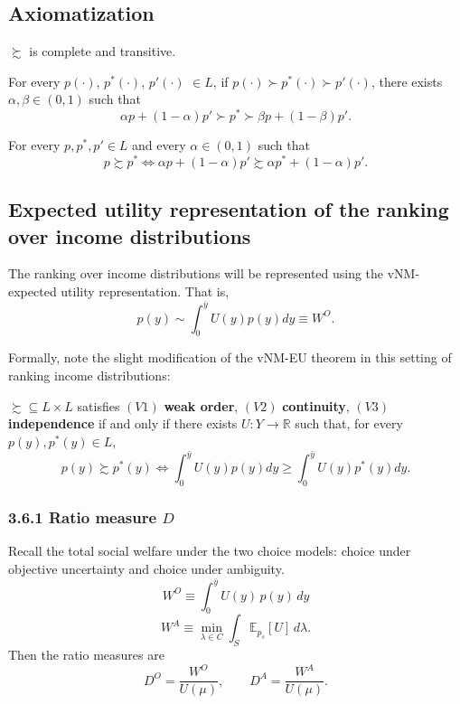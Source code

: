 \documentclass[Chp3.tex]{subfiles}
\begin{document}
\subsection*{Axiomatization}

\begin{ax.V}
$\succsim$ is complete and transitive.
\end{ax.V}

\begin{ax.V}[Continuity]
For every $p(\cdot)$, $p^*(\cdot)$, $p'(\cdot)$ $\in L$, if $p(\cdot) \succ p^*(\cdot) \succ p'(\cdot) $, there exists $\alpha, \beta \in (0,1)$ such that 
$$ \alpha p + (1-\alpha)p' \succ p^* \succ \beta p + (1-\beta) p' .$$ 
\end{ax.V}

\begin{ax.V}[Independence]
For every $p,p^*,p' \in L$ and every $\alpha \in (0,1)$ such that 
$$ p \succsim p^* \iff \alpha p + (1-\alpha)p' \succsim \alpha p^* + (1-\alpha)p'. $$
\end{ax.V}

\subsection*{Expected utility representation of the ranking over income distributions}

\par The ranking over income distributions will be represented using the vNM-expected utility representation. That is,
$$ p(y) \sim \int_{0}^{\bar{y}} U(y) p(y) dy \equiv W^{O}. $$

\par Formally, note the slight modification of the vNM-EU theorem in this setting of ranking income distributions:

\begin{tm}
$\succsim \subseteq L \times L$ satisfies $(V1)$ \textbf{weak order}, $(V2)$ \textbf{continuity}, $(V3)$ \textbf{independence} if and only if there exists $U: Y \to \mathbb{R}$ such that, for every $p(y), p^*(y) \in L,$
$$ p(y) \succsim p^*(y) \iff \int_{0}^{\bar{y}} U(y) p(y) dy \geq \int_{0}^{\bar{y}} U(y) p^*(y) dy. $$
\end{tm}

\subsubsection*{3.6.1 Ratio measure $D$}

Recall the total social welfare under the two choice models: choice under objective uncertainty and choice under ambiguity. 
\[
W^{O} \equiv \int_0^{\bar y} U(y)\,p(y)\,dy
\]
\[
W^{A} \equiv \min_{\lambda\in C}\int_S \mathbb{E}_{p_s}[U] \, d\lambda.
\]
Then the ratio measures are
\[
D^{O} = \frac{W^{O}}{U(\mu)},
\qquad
D^{A} = \frac{W^{A}}{U(\mu)}.
\]
\end{document}
